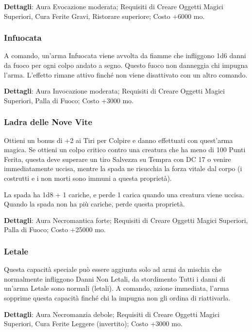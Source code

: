\begin{multicols}{2}
	\textbf{Dettagli}: Aura Evocazione moderata; Requisiti di Creare Oggetti Magici Superiori, Cura Ferite Gravi, Ristorare superiore; Costo +6000 mo.

	\subsubsection*{Infuocata}

	A comando, un'arma Infuocata viene avvolta da fiamme che infliggono 1d6 danni da fuoco per ogni colpo andato a segno. Questo fuoco non danneggia chi impugna l'arma. L'effetto rimane attivo finché non viene disattivato con un altro comando.

	\textbf{Dettagli}: Aura Invocazione moderata; Requisiti di Creare Oggetti Magici Superiori, Palla di Fuoco; Costo +3000 mo.

	\subsubsection*{Ladra delle Nove Vite}

	Ottieni un bonus di +2 ai Tiri per Colpire e danno effettuati con quest'arma magica. Se ottieni un colpo critico contro una creatura che ha meno di 100 Punti Ferita, questa deve superare un tiro Salvezza su Tempra con DC 17 o venire immediatamente uccisa, mentre la spada ne risucchia la forza vitale dal corpo (i costrutti e i non morti sono immuni a questa proprietà).

	La spada ha 1d8 + 1 cariche, e perde 1 carica quando una creatura viene uccisa. Quando la spada non ha più cariche, perde questa proprietà.

	\textbf{Dettagli}: Aura Necromantica forte; Requisiti di Creare Oggetti Magici Superiori, Palla di Fuoco; Costo +25000 mo.

	\subsubsection*{Letale}

	Questa capacità speciale può essere aggiunta solo ad armi da mischia che normalmente infliggono Danni Non Letali, da stordimento Tutti i danni di un'arma Letale sono normali (letali). A comando, azione immediata, l'arma sopprime questa capacità finché chi la impugna non gli ordina di riattivarla.

	\textbf{Dettagli}: Aura Necromanzia debole; Requisiti di Creare Oggetti Magici Superiori, Cura Ferite Leggere (invertito); Costo +3000 mo.




\end{multicols}
